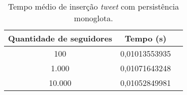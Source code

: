 \begin{table}[H]
    \centering
    \caption[Tempo médio de inserção \textit{tweet} com persistência monoglota]{Tempo médio de inserção \textit{tweet} com persistência monoglota.\label{tab:insert_mono}}
    \begin{tabular}{ccc}
        \hline
            Quantidade de seguidores & Tempo (s) \\
        \hline
            100  &   0,01013553935 \\
            1.000  & 0,01071643248 \\
            10.000 & 0,01052849981 \\
        \hline
    \end{tabular}
\end{table}
